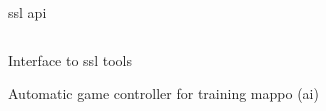 
\begin{frame}{\ac{ssl} \acf{api}}

    \begin{columns}[T]
        \begin{column}{0.4\textwidth}

        \vspace{2cm}
        
        Interface to \ac{ssl} tools

        \vspace{1em}
  
        Automatic game controller for training \ac{mappo} (\acs{ai})
            
        \end{column}
        \begin{column}{0.6\textwidth}
    
            \begin{adjustbox}{scale=1,center,margin={-0.5cm,3cm,0cm,0cm}}
                
            \end{adjustbox}
        
        \end{column}
    \end{columns}
    
\end{frame}

